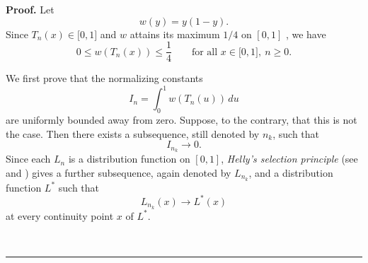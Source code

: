 \documentclass[onecolumn]{article}
\newenvironment{proof}[1][Proof]{\noindent\textbf{#1.} }{\ \rule{0.5em}{0.5em}}
\begin{document}
\begin{proof}
\noindent Let 
\begin{equation}
w(y)=y(1-y).  \label{501a}
\end{equation}%
Since $T_{n}(x)\in \lbrack 0,1]$ and $w$ attains its maximum $1/4$ on $[0,1]$%
, we have 
\begin{equation}
0\leq w(T_{n}(x))\leq \frac{1}{4}\qquad \text{for all }x\in \lbrack 0,1],\
n\geq 0.  \label{501b}
\end{equation}

We first prove that the normalizing constants 
\begin{equation}
I_{n}=\int_{0}^{1}w(T_{n}(u))\,du  \label{501c}
\end{equation}%
are uniformly bounded away from zero. Suppose, to the contrary, that this is
not the case. Then there exists a subsequence, still denoted by $n_{k}$,
such that 
\begin{equation}
I_{n_{k}}\rightarrow 0.  \label{502a}
\end{equation}%
Since each $L_{n}$ is a distribution function on $[0,1]$, \textit{Helly's
selection principle }(see \cite[Chapter 5]{[68]} and \cite[Chapter 36.5]%
{[69]}) gives a further subsequence, again denoted by $L_{n_{k}}$, and a
distribution function $L^{\ast }$ such that 
\begin{equation}
L_{n_{k}}(x)\rightarrow L^{\ast }(x)  \label{502b}
\end{equation}%
at every continuity point $x$ of $L^{\ast }$.


\end{proof}
\end{document}
